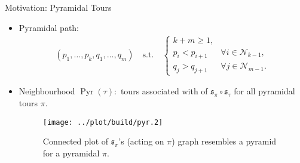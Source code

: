 \documentclass[
  size=10pt,
  style=klope,
  paper=screen,
  pauseslide,
  nopagebreaks,
  hlsections,
  fleqn
]{powerdot}
\def\eqitspace{\vspace{-5mm}}
\begin{document}
\begin{slide}[toc=Pyramidal Tours]{Motivation: Pyramidal Tours}
\begin{itemize}
  \item
  Pyramidal path:
  \begin{align}
  \left( p_1, \ldots, p_k, q_1, \ldots, q_m \right) \quad \text{s.t.} \quad
  \begin{cases}
  k+m \geq 1, & \\
  p_i < p_{i+1} \; & \forall i \in \mathcal{N}_{k-1},\\
  q_j > q_{j+1} \; & \forall j \in \mathcal{N}_{m-1}.
  \end{cases}
  \end{align}
  \item
  Neighbourhood $\operatorname{Pyr}\left(\tau\right):$
  tours associated with of $\mathfrak{s}_\pi \circ \mathfrak{s}_\tau$
  for all pyramidal tours $\pi$.
  \begin{figure}[H]
    \centering
    \texttt{[image: ../plot/build/pyr.2]}
    \caption{%
      Connected plot of $\mathfrak{s}_\pi$'s
      (acting on $\pi$)
      graph resembles a pyramid
      for a pyramidal $\pi$.
    }
  \end{figure}
\end{itemize}
\end{slide}
\end{document}
